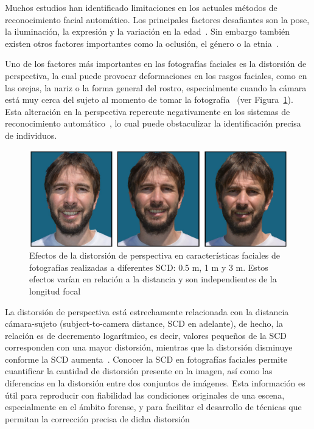 Muchos estudios han identificado limitaciones en los actuales métodos de reconocimiento facial automático. Los principales factores desafiantes son la pose, la iluminación, la expresión y la variación en la edad~\cite{4,6}. Sin embargo también existen otros factores importantes como la oclusión, el género o la etnia~\cite{5,7}.

Uno de los factores más importantes en las fotografías faciales es la distorsión de perspectiva, la cual puede provocar deformaciones en los rasgos faciales, como en las orejas, la nariz o la forma general del rostro, especialmente cuando la cámara está muy cerca del sujeto al momento de tomar la fotografía~\cite{12} (ver Figura~\ref{fig1.1}). Esta alteración en la perspectiva repercute negativamente en los sistemas de reconocimiento automático~\cite{9,10,11}, lo cual puede obstaculizar la identificación precisa de individuos. 

\begin{figure}[h]
	\centering
	\includegraphics[scale=0.25]{imagenes/cap1/facial_distortion.png}
	\caption{Efectos de la distorsión de perspectiva en características faciales de fotografías realizadas a diferentes SCD: 0.5 m, 1 m y 3 m. Estos efectos varían en relación a la distancia y son independientes de la longitud focal~\cite{14}}
	\label{fig1.1}
\end{figure}


La distorsión de perspectiva está estrechamente relacionada con la distancia cámara-sujeto (subject-to-camera distance, SCD en adelante), de hecho, la relación es de decremento logarítmico, es decir, valores pequeños de la SCD corresponden con una mayor distorsión, mientras que la distorsión disminuye conforme la SCD aumenta~\cite{23}. Conocer la SCD en fotografías faciales permite cuantificar la cantidad de distorsión presente en la imagen, así como las diferencias en la distorsión entre dos conjuntos de imágenes. Esta información es útil para reproducir con fiabilidad las condiciones originales de una escena, especialmente en el ámbito forense, y para facilitar el desarrollo de técnicas que permitan la corrección precisa de dicha distorsión

